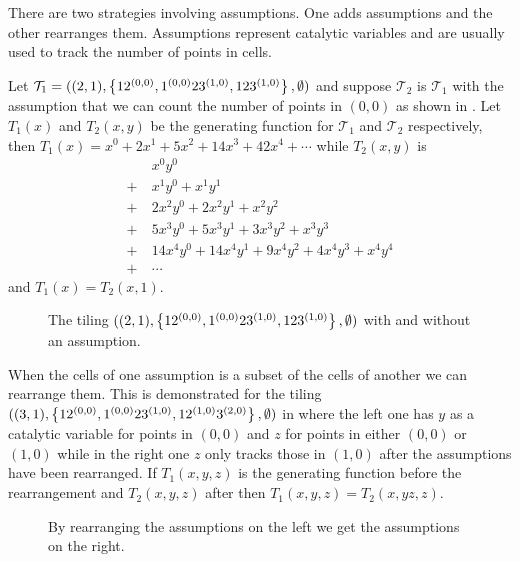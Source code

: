 There are two strategies involving assumptions. One adds assumptions and the other rearranges them. Assumptions represent catalytic variables and are usually used to track the number of points in cells. 

Let $\mathcal{T}_1 = ((2,1),\left\{12^{(0,0)},1^{(0,0)}23^{(1,0)},123^{(1,0)}\right\},\emptyset)$ and suppose $\mathcal{T}_2$ is $\mathcal{T}_1$ with the assumption that we can count the number of points in $(0,0)$ as shown in . Let $T_1(x)$ and $T_2(x,y)$ be the generating function for $\mathcal{T}_1$ and $\mathcal{T}_2$ respectively, then $T_1(x) = x^0 + 2x^1 + 5x^2 + 14x^3 + 42x^4 + \dotsm$ while $T_2(x,y)$ is
\begin{align*}
    &\ x^0y^0\\
    + &\ x^1y^0 + x^1y^1\\
    + &\ 2x^2y^0 + 2x^2y^1 + x^2y^2\\
    + &\ 5x^3y^0 + 5x^3y^1 + 3x^3y^2 + x^3y^3\\
    + &\ 14x^4y^0 + 14x^4y^1 + 9x^4y^2 + 4x^4y^3 + x^4y^4\\
    + &\ \dotsm  
\end{align*}
and $T_1(x) = T_2(x,1)$.

\begin{figure}[ht!]
    \centering
    
    \caption{The tiling $((2,1),\left\{12^{(0,0)},1^{(0,0)}23^{(1,0)},123^{(1,0)}\right\},\emptyset)$ with and without an assumption.}
    \label{fig:addassumption}
\end{figure}

When the cells of one assumption is a subset of the cells of another we can rearrange them. This is demonstrated for the tiling $((3,1),\left\{12^{(0,0)},1^{(0,0)}23^{(1,0)},12^{(1,0)}3^{(2,0)}\right\},\emptyset)$ in  where the left one has $y$ as a catalytic variable for points in $(0,0)$ and $z$ for points in either $(0,0)$ or $(1,0)$ while in the right one $z$ only tracks those in $(1,0)$ after the assumptions have been rearranged. If $T_1(x,y,z)$ is the generating function before the rearrangement and $T_2(x,y,z)$ after then $T_1(x,y,z) = T_2(x,yz,z)$.

\begin{figure}[ht!]
    \centering
    
    \caption{By rearranging the assumptions on the left we get the assumptions on the right.}
    \label{fig:assrear}
\end{figure}